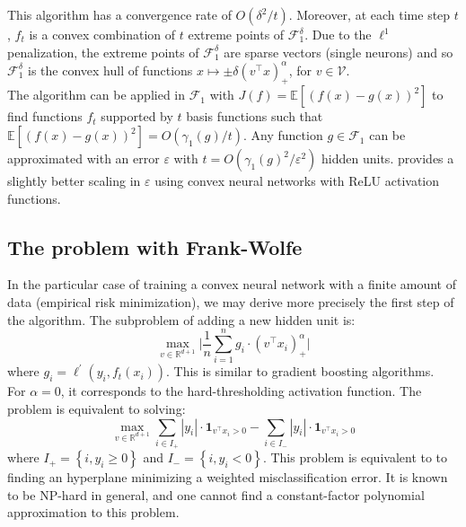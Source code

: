 \documentclass[a4paper, 11pt]{scrartcl}
\begin{document}
{This algorithm has a convergence rate of $O(\delta^2 /t)$. Moreover, at each time step $t$, $f_t$ is a convex combination of $t$ extreme points of $\mathcal{F}_1^\delta$. Due to the $\ell^1$ penalization, the extreme points of $\mathcal{F}_1^\delta$ are sparse vectors (single neurons) and so $\mathcal{F}_1^\delta$ is the convex hull of functions $x \mapsto \pm \delta  (v^\top x)^\alpha_{+}$, for $v \in \mathcal{V}$.\\


The algorithm can be applied in $\mathcal{F}_1$ with $J(f) = \mathbb{E}\left[(f(x) - g(x))^2\right]$ to find functions $f_t$ supported by $t$ basis functions such that $\mathbb{E}\left[(f(x) - g(x))^2\right] = O(\gamma_1(g) /t)$. Any function $g \in \mathcal{F}_1$ can be approximated with an error $\varepsilon$ with $t = O(\gamma_1(g)^2 /\varepsilon^2)$ hidden units. \cite{bach2017breaking} provides a slightly better scaling in $\varepsilon$ using convex neural networks with ReLU activation functions.

\subsection{The problem with Frank-Wolfe}

In the particular case of training a convex neural network with a finite amount of data (empirical risk minimization), we may derive more precisely the first step of the algorithm. The subproblem of adding a new hidden unit is:
\begin{equation}
\max_{v \in \mathbb{R}^{d+1}} \Biggl\lvert\frac{1}{n} \sum_{i=1}^n g_i \cdot (v^\top x_i)^\alpha_+ \Biggr\rvert
\end{equation}
where $g_i = \ell^\prime(y_i, f_t(x_i))$. This is similar to gradient boosting algorithms.\\

For $\alpha = 0$, it corresponds to the hard-thresholding activation function. The problem is equivalent to solving:
\begin{equation}
\max_{v \in \mathbb{R}^{d+1}} \sum_{i\in I_+} |y_i| \cdot \mathbf{1}_{v^\top x_i> 0}  - \sum_{i\in I_-} |y_i| \cdot \mathbf{1}_{v^\top x_i> 0}
\end{equation}
where $I_+ = \left\{i, y_i \geq 0 \right\}$ and $I_- = \left\{i, y_i < 0 \right\}$. This problem is equivalent to to finding an hyperplane minimizing a weighted misclassification error. It is known to be NP-hard in general, and one cannot find a constant-factor polynomial approximation to this problem.\\

}
\end{document}
